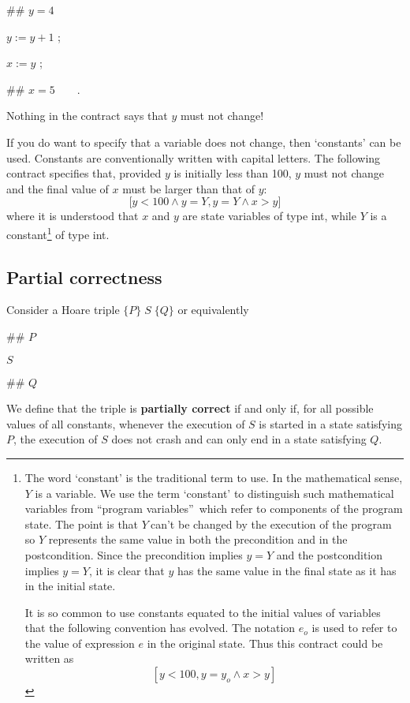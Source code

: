 \documentclass[muchmore,11pt]{article}%
\begin{document}
\begin{code}
\#\# $y=4$

$y:=y+1$ ;

$x:=y$ ;

\#\# $x=5\qquad$.
\end{code}

\noindent Nothing in the contract says that $y$ must not change!

If you do want to specify that a variable does not change, then `constants'
can be used. Constants are conventionally written with capital letters. The
following contract specifies that, provided $y$ is initially less than 100,
$y$ must not change and the final value of $x$ must be larger than that of
$y$:%
\[
\lbrack y<\mathrm{100}\wedge y=Y,y=Y\wedge x>y]
\]
where it is understood that $x$ and $y$ are state variables of type
\textsf{int},\textsf{ }while $Y$ is a constant\footnote{The word `constant' is
the traditional term to use. In the mathematical sense, $Y$ is a variable. We
use the term `constant' to distinguish such mathematical variables from
\textquotedblleft program variables\textquotedblright\ which refer to
components of the program state. The point is that $Y\ $can't be changed by
the execution of the program so $Y$ represents the same value in both the
precondition and in the postcondition. Since the precondition implies $y=Y$
and the postcondition implies $y=Y$, it is clear that $y$ has the same value
in the final state as it has in the initial state.
\par
It is so common to use constants equated to the initial values of variables
that the following convention has evolved. The notation $e_{o}$ is used to
refer to the value of expression $e$ in the original state. Thus this contract
could be written as%
\[
\left[  y<100,y=y_{o}\wedge x>y\right]
\]
} of type \textsf{int}.

\subsection{Partial correctness}

Consider a Hoare triple $\{P\}\;S\;\{Q\}$ or equivalently

\begin{code}
\#\# $P$

$S$

\#\# $Q$
\end{code}

\noindent We define that the triple is \textbf{partially correct} if and only
if, for all possible values of all constants, whenever the execution of $S$ is
started in a state satisfying $P$, the execution of $S$ does not crash and can
only end in a state satisfying $Q$.
\end{document}
